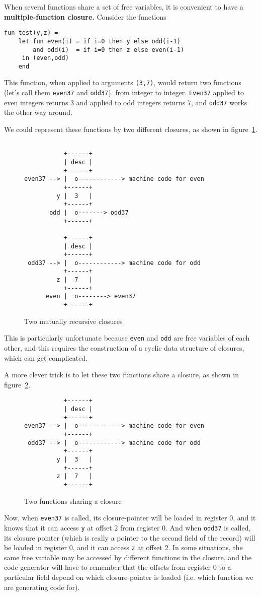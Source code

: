 When several functions share a set of free variables, it is convenient
to have a {\bf multiple-function closure.}
Consider the functions
\begin{verbatim}
fun test(y,z) =
    let fun even(i) = if i=0 then y else odd(i-1)
        and odd(i)  = if i=0 then z else even(i-1)
     in (even,odd)
    end
\end{verbatim}
This function, when applied to arguments \verb"(3,7)", would return
two functions (let's call them \verb"even37" and \verb"odd37").
from integer to integer.  \verb"Even37" applied to even integers
returns 3 and applied to odd integers returns 7, and \verb"odd37"
works the other way around.

We could represent these functions by two different closures, as shown
in figure~\ref{twoclos}.
\begin{figure}[htbp]
\label{twoclos}
\begin{verbatim}

           +------+
           | desc |
           +------+
even37 --> |  o------------> machine code for even
           +------+
         y |  3   |
           +------+
       odd |  o-------> odd37
           +------+

           +------+
           | desc |
           +------+
 odd37 --> |  o------------> machine code for odd
           +------+
         z |  7   |
           +------+
      even |  o--------> even37
           +------+
\end{verbatim}
\caption{Two mutually recursive closures}
\end{figure}
This is particularly unfortunate because \verb"even" and \verb"odd"
are free variables
of each other, and this requires the construction
of a cyclic data structure of closures, which can get complicated.

A more clever trick\cite{appel87:sml}\cite{kranz86} is to let these
two functions share a closure, as shown in figure~\ref{oneclos}.
\begin{figure}[htbp]
\label{oneclos}
\begin{verbatim}
           +------+
           | desc |
           +------+
even37 --> |  o------------> machine code for even
           +------+
 odd37 --> |  o------------> machine code for odd
           +------+
         y |  3   |
           +------+
         z |  7   |
           +------+
\end{verbatim}
\caption{Two functions sharing a closure}
\end{figure}
Now, when \verb"even37" is called, its closure-pointer will be loaded
in register 0, and it knows that it can access \verb:y: at offset 2 from
register 0.  And when \verb"odd37" is called, its closure pointer
(which is really a pointer to the second field of the record) will be
loaded in register 0, and it can access \verb"z" at offset 2.
In some situations, the same free variable may be accessed by different
functions in the closure, and the code generator will have to remember
that the offsets from register 0 to a particular field
depend on which closure-pointer is loaded (i.e. which function we are
generating code for).

